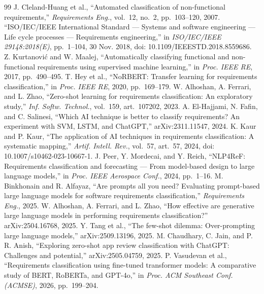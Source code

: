 \documentclass[conference]{IEEEtran}
\begin{document}
\begin{thebibliography}{99}
\setlength{\itemsep}{0pt plus 0.3pt}
 J. Cleland-Huang et al., ``Automated classification of
non-functional requirements,'' \emph{Requirements Eng.}, vol.~12, no.~2,
pp.~103--120, 2007.
 ``ISO/IEC/IEEE International Standard --- Systems and
software engineering --- Life cycle processes --- Requirements engineering,''
in \emph{ISO/IEC/IEEE 29148:2018(E)}, pp.~1--104, 30 Nov. 2018,
doi: 10.1109/IEEESTD.2018.8559686.
 Z. Kurtanovi\'c and W. Maalej, ``Automatically
classifying functional and non-functional requirements using supervised machine
learning,'' in \emph{Proc. IEEE RE}, 2017, pp.~490--495.
 T. Hey et al., ``NoRBERT: Transfer learning for
requirements classification,'' in \emph{Proc. IEEE RE}, 2020, pp.~169--179.
 W. Alhoshan, A. Ferrari, and L. Zhao, ``Zero-shot
learning for requirements classification: An exploratory study,''
\emph{Inf. Softw. Technol.}, vol.~159, art.~107202, 2023.
 A. El-Hajjami, N. Fafin, and C. Salinesi, ``Which AI
technique is better to classify requirements? An experiment with SVM, LSTM, and
ChatGPT,'' arXiv:2311.11547, 2024.
 K. Kaur and P. Kaur, ``The application of AI techniques in
requirements classification: A systematic mapping,'' \emph{Artif. Intell.
Rev.}, vol.~57, art.~57, 2024, doi: 10.1007/s10462-023-10667-1.
 J. Peer, Y. Mordecai, and Y. Reich, ``NLP4ReF: Requirements
classification and forecasting --- From model-based design to large language
models,'' in \emph{Proc. IEEE Aerospace Conf.}, 2024, pp.~1--16.
 M. Binkhonain and R. Alfayaz, ``Are prompts all you
need? Evaluating prompt-based large language models for software requirements
classification,'' \emph{Requirements Eng.}, 2025.
 W. Alhoshan, A. Ferrari, and L. Zhao, ``How effective
are generative large language models in performing requirements
classification?'' arXiv:2504.16768, 2025.
 Y. Tang et al., ``The few-shot dilemma: Over-prompting large
language models,'' arXiv:2509.13196, 2025.
 M. Chaudhary, C. Jain, and P. R. Anish, ``Exploring
zero-shot app review classification with ChatGPT: Challenges and potential,''
arXiv:2505.04759, 2025.
 P. Vasudevan et al., ``Requirements classification using
fine-tuned transformer models: A comparative study of BERT, RoBERTa, and
GPT-4o,'' in \emph{Proc. ACM Southeast Conf. (ACMSE)}, 2026, pp.~199--204.

\end{thebibliography}
\end{document}

